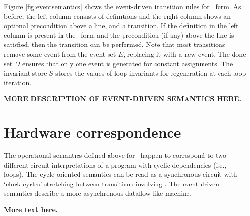 \documentclass[12pt,notitlepage,twoside]{article}
\begin{document}
Figure \ref{fig:eventsemantics} shows the event-driven transition
rules for \ssiplus\ form.  As before, the left column consists of
definitions and the right column shows an optional precondition above
a line, and a transition.  If the definition in the left column is
present in the \ssiplus\ form and the precondition (if any) above the
line is satisfied, then the transition can be performed.  Note that
most transitions remove some event from the event set $E$, replacing
it with a new event.  The done set $D$ ensures that only one event is
generated for constant assignments.  The invariant store $S$ stores
the values of loop invariants for regeneration at each loop iteration.

\textbf{MORE DESCRIPTION OF EVENT-DRIVEN SEMANTICS HERE.}

\section{Hardware correspondence}

The operational semantics defined above for \ssiplus\ happen to
correspond to two different circuit interpretations of a program with
cyclic dependencies (i.e., loops).  The cycle-oriented semantics can
be read as a synchronous circuit with `clock cycles' stretching
between transitions involving .  The event-driven
semantics describe a more asynchronous dataflow-like machine.

\textbf{More text here.}


\appendix
\end{document}
